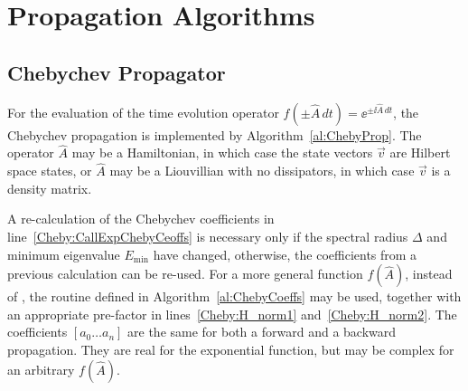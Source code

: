 \chapter{Propagation Algorithms}
\label{AppendixAlgos}

\section{Chebychev Propagator}

For the evaluation of the time evolution operator
$f(\pm\hat{A}\,dt) = \ee^{\pm\ii \hat{A}\,dt}$, the Chebychev propagation is
implemented by Algorithm~\ref{al:ChebyProp}. The operator $\hat{A}$ may be
a Hamiltonian, in which case the state vectors $\vec{v}$ are Hilbert space
states, or $\hat{A}$ may be a Liouvillian with no dissipators, in which case
$\vec{v}$ is a density matrix.

A re-calculation of the Chebychev coefficients in
line~\ref{Cheby:CallExpChebyCeoffs} is necessary only if the spectral
radius $\Delta$ and minimum eigenvalue $E_{\min}$ have changed, otherwise, the
coefficients from a previous calculation can be re-used. For a more general
function $f(\hat{A})$, instead of , the routine
 defined in Algorithm~\ref{al:ChebyCoeffs} may be used,
together with an appropriate pre-factor in lines~\ref{Cheby:H_norm1}
and~\ref{Cheby:H_norm2}. The coefficients $[a_0 \dots a_n]$ are the same for
both a forward and a backward propagation.
They are real for the exponential function, but may be complex for an arbitrary
$f(\hat{A})$.

